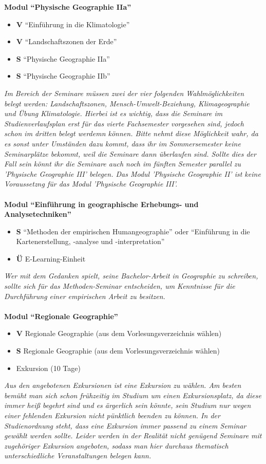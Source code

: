 \textbf{Modul "`Physische Geographie IIa"'}
	\begin{itemize}
		\item \textbf{V} "`Einführung in die Klimatologie"'
		\item \textbf{V} "`Landschaftszonen der Erde"'
		\item \textbf{S} "`Physische Geographie IIa"'
		\item \textbf{S} "`Physische Geographie IIb"'
	\end{itemize}	

\emph{Im Bereich der Seminare müssen zwei der vier folgenden Wahlmöglichkeiten belegt werden: Landschaftszonen, Mensch-Umwelt-Beziehung, Klimageographie und Übung Klimatologie. Hierbei ist es wichtig, dass die Seminare im Studienverlaufsplan erst für das vierte Fachsemester vorgesehen sind, jedoch schon im dritten belegt werdemn können. Bitte nehmt diese Möglichkeit wahr, da es sonst unter Umständen dazu kommt, dass ihr im Sommersemester keine Seminarplätze bekommt, weil die Seminare dann überlaufen sind. Sollte dies der Fall sein könnt ihr die Seminare auch noch im fünften Semester parallel zu 'Physische Geographie III' belegen. Das Modul 'Physische Geographie II' ist keine Voraussetzng für das Modul 'Physische Geographie III'.}\\\\
\textbf{Modul "`Einführung in geographische Erhebungs- und Analysetechniken"'}
	\begin{itemize}
		\item \textbf{S} "`Methoden der empirischen Humangeographie"' oder "`Einführung in die Kartenerstellung, -analyse und -interpretation"'
		\item \textbf{Ü} E-Learning-Einheit
	\end{itemize}
\emph{Wer mit dem Gedanken spielt, seine Bachelor-Arbeit in Geographie zu schreiben, sollte sich für das Methoden-Seminar entscheiden, um Kenntnisse für die Durchführung einer empirischen Arbeit zu besitzen.}\\\\
\textbf{Modul "`Regionale Geographie"'}
	\begin{itemize}
		\item \textbf{V} Regionale Geographie (aus dem Vorlesungsverzeichnis wählen)
		\item \textbf{S} Regionale Geographie (aus dem Vorlesungsverzeichnis wählen)
		\item Exkursion (10 Tage)
	\end{itemize}
\emph{Aus den angebotenen Exkursionen ist eine Exkursion zu wählen. Am besten bemüht man sich schon frühzeitig im Studium um einen Exkursionsplatz, da diese immer heiß begehrt sind und es ärgerlich sein könnte, sein Studium nur wegen einer fehlenden Exkursion nicht pünktlich beenden zu können. In der Studienordnung steht, dass eine Exkursion immer passend zu einem Seminar gewählt werden sollte. Leider werden in der Realität nicht genügend Seminare mit zugehöriger Exkursion angeboten, sodass man hier durchaus thematisch unterschiedliche Veranstaltungen belegen kann.}
